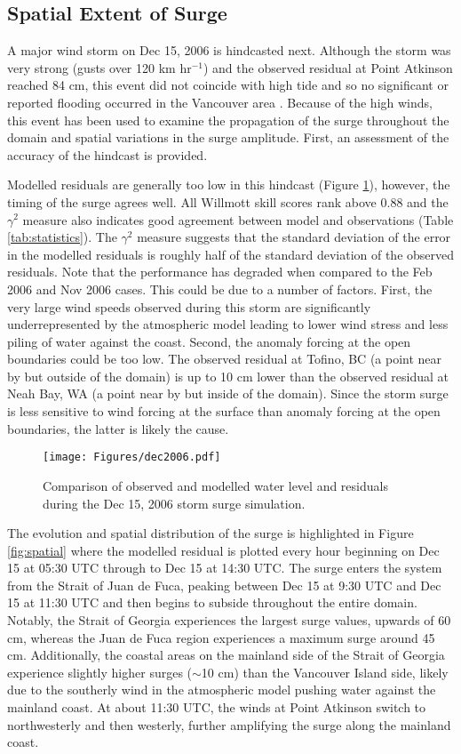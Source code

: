 \documentclass{tATO2e}
\begin{document}
\subsection{Spatial Extent of Surge}\label{sec:spatial}
A major wind storm on Dec 15, 2006 is hindcasted next. Although the storm was very strong (gusts over 120 km hr$^{-1}$) and the observed residual at Point Atkinson reached 84 cm, this event did not coincide with high tide and so no significant or reported flooding occurred in the Vancouver area \citep{forseth2006adaptation}. Because of the high winds, this event has been used to examine the propagation of the surge throughout the domain and spatial variations in the surge amplitude. First, an assessment of the accuracy of the hindcast is provided. 

Modelled residuals are generally too low in this hindcast (Figure \ref{fig:dec2006}), however, the timing of the surge agrees well. All Willmott skill scores rank above 0.88 and the $\gamma^2$ measure also indicates good agreement between model and observations (Table \ref{tab:statistics}). The $\gamma^2$ measure suggests that the standard deviation of the error in the modelled residuals is roughly half of the standard deviation of the observed residuals. Note that the performance has degraded when compared to the Feb 2006 and Nov 2006 cases. This could be due to a number of factors. First, the very large wind speeds observed during this storm are significantly underrepresented by the atmospheric model leading to lower wind stress and less piling of water against the coast. Second, the anomaly forcing at the open boundaries could be too low. The observed residual at Tofino, BC (a point near by but outside of the domain) is up to 10 cm lower than the observed residual at Neah Bay, WA (a point near by but inside of the domain). Since the storm surge is less sensitive to wind forcing at the surface than anomaly forcing at the open boundaries, the latter is likely the cause. 

\begin{figure}
\centering
\texttt{[image: Figures/dec2006.pdf]}
\caption{Comparison of observed and modelled water level and residuals during the Dec 15, 2006 storm surge simulation. }
\label{fig:dec2006}
\end{figure}

The evolution and spatial distribution of the surge is highlighted in Figure \ref{fig:spatial} where the modelled residual is plotted every hour beginning on Dec 15 at 05:30 UTC through to Dec 15 at 14:30 UTC. The surge enters the system from the Strait of Juan de Fuca, peaking between Dec 15 at 9:30 UTC and Dec 15 at 11:30 UTC and then begins to subside throughout the entire domain. Notably, the Strait of Georgia experiences the largest surge values, upwards of 60 cm, whereas the Juan de Fuca region experiences a maximum surge around 45 cm. Additionally, the coastal areas on the mainland side of the Strait of Georgia experience slightly higher surges ($\sim$10 cm) than the Vancouver Island side, likely due to the southerly wind in the atmospheric model pushing water against the mainland coast. At about 11:30 UTC, the winds at Point Atkinson switch to northwesterly and then westerly, further amplifying the surge along the mainland coast. 
\end{document}
